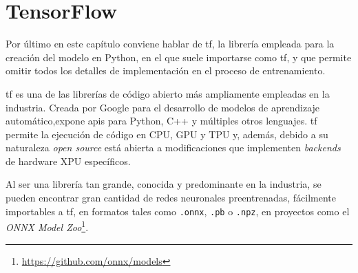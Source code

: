 \section{TensorFlow}
\label{sec:tensorflow}
Por último en este capítulo conviene hablar de \acrlong{tf}, la librería empleada para la creación del modelo en Python, en el que suele importarse como \acrshort{tf}, y que permite omitir todos los detalles de implementación en el proceso de entrenamiento.

\acrlong{tf} es una de las librerías de código abierto más ampliamente empleadas en la industria. Creada por Google para el desarrollo de modelos de aprendizaje automático,expone \acrshort{api}s para Python, C++ y múltiples otros lenguajes. \acrlong{tf} permite la ejecución de código en CPU, GPU y TPU y, además, debido a su naturaleza \textit{open source} está abierta a modificaciones que implementen \textit{\gls{backend}s} de hardware XPU específicos.

Al ser una librería tan grande, conocida y predominante en la industria, se pueden encontrar gran cantidad de redes neuronales preentrenadas, fácilmente importables a \acrlong{tf}, en formatos tales como \texttt{.onnx}, \texttt{.pb} o \texttt{.npz}, en proyectos como el \textit{ONNX Model Zoo}\footnote{\url{https://github.com/onnx/models}}.